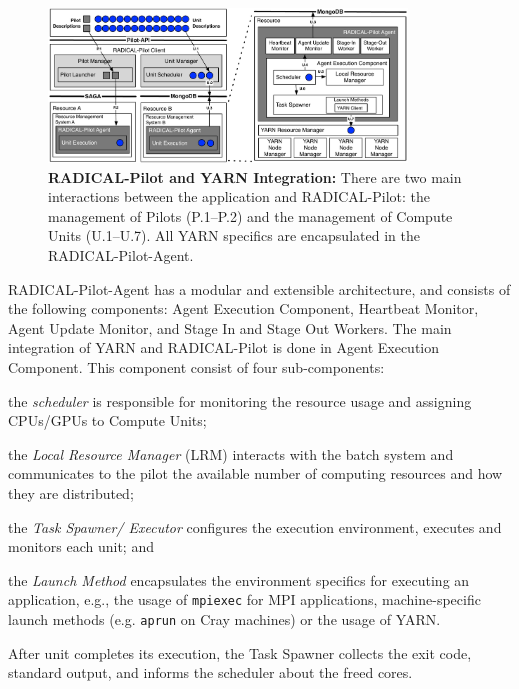 \begin{figure}
    \centering
    \includegraphics[width=0.85\textwidth]{figures/data_analytics_hpc/hpc_hadoop/rp-architecture-yarn.pdf}
    \caption{\textbf{RADICAL-Pilot and YARN Integration:} There are two main
    interactions between the application and RADICAL-Pilot: the management of
    Pilots (P.1--P.2) and the management of Compute Units (U.1--U.7). All YARN
    specifics are encapsulated in the RADICAL-Pilot-Agent.}
    \label{fig:comp_rp_arch}
\end{figure}

RADICAL-Pilot-Agent has a modular and extensible architecture, and consists of
the following components: Agent Execution Component, Heartbeat Monitor, Agent
Update Monitor, and Stage In and Stage Out Workers. The main integration of YARN
and RADICAL-Pilot is done in Agent Execution Component. This component
consist of four sub-components:
\begin{inparaenum}[a)]
    \item the \textit{scheduler} is responsible for monitoring the resource
    usage and assigning CPUs/GPUs to Compute Units;
    \item the \textit{Local Resource Manager} (LRM) interacts with the batch
    system and communicates to the pilot the available number of computing
    resources and how they are distributed;
    \item the \textit{Task Spawner/ Executor} configures the execution
    environment, executes and monitors each unit; and
    \item the \textit{Launch Method} encapsulates the environment specifics for
    executing an application, e.g., the usage of \texttt{mpiexec} for MPI
    applications, machine-specific launch methods (e.g. \texttt{aprun} on Cray
    machines) or the usage of YARN.
\end{inparaenum}
After unit completes its execution, the Task Spawner collects the exit code,
standard output, and informs the scheduler about the freed cores.


